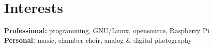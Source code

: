 \documentclass[]{friggeri-cv} %
\begin{document}

\section{Interests}

\textbf{Professional:} programming, GNU/Linux, opensource, Raspberry Pi
\\
\textbf{Personal:} music, chamber choir, analog \& digital photography

\end{document}

